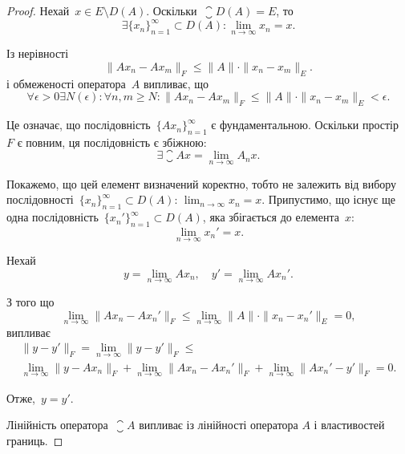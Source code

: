 \begin{proof}
Нехай~$x \in E \setminus D(A)$. Оскільки~$\closure D(A) = E$, то
\begin{equation*}
    \exists \{x_n\}_{n = 1}^\infty \subset D(A):
    \lim_{n \to \infty} x_n = x.
\end{equation*}

Із нерівності
\begin{equation*}
    \|Ax_n - Ax_m\|_F \le \|A\| \cdot \|x_n - x_m\|_E.
\end{equation*}
і обмеженості оператора~$A$ випливає, що
\begin{equation*}
    \forall \epsilon > 0 \exists N(\epsilon):
    \forall n, m \ge N:
    \|A x_n - A x_m\|_F \le \|A\| \cdot \|x_n - x_m\|_E < \epsilon.
\end{equation*}

Це означає, що послідовність~$\{Ax_n\}_{n = 1}^\infty$ є фундаментальною.
Оскільки простір~$F$ є повним, ця послідовність є збіжною:
\begin{equation*}
    \exists \closure A x = \lim_{n \to \infty} A_n x.
\end{equation*}

Покажемо, що цей елемент визначений коректно, тобто не
залежить від вибору послідовності~$\{x_n\}_{n = 1}^\infty \subset D(A)$:
$\lim_{n \to \infty} x_n = x$.
Припустимо, що існує ще одна послідовність~$\{x_n'\}_{n = 1}^\infty \subset D(A)$,
яка збігається до елемента~$x$:
\begin{equation*}
    \lim_{n \to \infty} x_n' = x.
\end{equation*}

Нехай
\begin{equation*}
    y = \lim_{n \to \infty} A x_n, \quad y' = \lim_{n \to \infty} A x_n'.
\end{equation*}

З того що
\begin{equation*}
    \lim_{n \to \infty} \|Ax_n - Ax_n'\|_F \le
    \lim_{n \to \infty} \|A\| \cdot \|x_n - x_n'\|_E = 0,
\end{equation*}
випливає
\begin{multline*}
    \|y - y'\|_F = \lim_{n \to \infty} \|y - y'\|_F \le \\
    \lim_{n \to \infty} \|y - A x_n\|_F +
    \lim_{n \to \infty} \|A x_n - A x_n'\|_F +
    \lim_{n \to \infty} \|A x_n' - y'\|_F = 0.
\end{multline*}

Отже,~$y = y'$.

Лінійність оператора~$\closure A$ випливає із лінійності оператора
$A$ і властивостей границь.


\end{proof}
